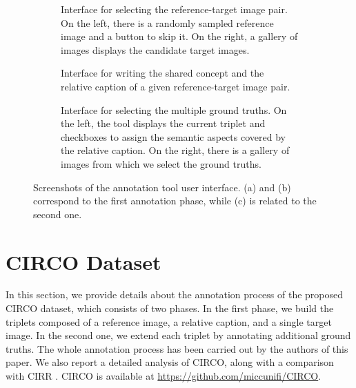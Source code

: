 \documentclass[10pt,twocolumn,letterpaper]{article}
\begin{document}
\begin{figure}
  \centering
  \begin{subfigure}{\linewidth}
    \caption{Interface for selecting the reference-target image pair. On the left, there is a randomly sampled reference image and a button to skip it. On the right, a gallery of images displays the candidate target images. \vspace{10pt}}
    \label{fig:annotator_index}
  \end{subfigure}
  \begin{subfigure}{\linewidth}
    \caption{Interface for writing the shared concept and the relative caption of a given reference-target image pair. \vspace{10pt}}
    \label{fig:annotator_caption}
  \end{subfigure}
  \begin{subfigure}{\linewidth}
    \caption{Interface for selecting the multiple ground truths. On the left, the tool displays the current triplet and checkboxes to assign the semantic aspects covered by the relative caption. On the right, there is a gallery of images from which we select the ground truths.}
    \label{fig:annotator_gt_selector}
  \end{subfigure}
  \caption{Screenshots of the annotation tool user interface. (a) and (b) correspond to the first annotation phase, while (c) is related to the second one.}
  \label{fig:annotator}
\end{figure}


\section{CIRCO Dataset}
In this section, we provide details about the annotation process of the proposed CIRCO dataset, which consists of two phases. In the first phase, we build the triplets composed of a reference image, a relative caption, and a single target image. In the second one, we extend each triplet by annotating additional ground truths. The whole annotation process has been carried out by the authors of this paper. We also report a detailed analysis of CIRCO, along with a comparison with CIRR \cite{liu2021image}. 
CIRCO is available at \href{https://github.com/miccunifi/CIRCO}{\small{\url{https://github.com/miccunifi/CIRCO}}}. 
\end{document}
